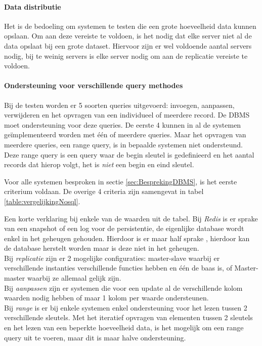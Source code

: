 \paragraph{Data distributie} Het is de bedoeling om systemen te testen die een grote hoeveelheid data kunnen opslaan. Om aan deze vereiste te voldoen, is het nodig dat elke server niet al de data opslaat bij een grote dataset. Hiervoor zijn er wel voldoende aantal servers nodig, bij te weinig servers is elke server nodig om aan de replicatie vereiste te voldoen. 

\paragraph{Ondersteuning voor verschillende query methodes} Bij de testen worden er 5 soorten queries uitgevoerd: invoegen, aanpassen, verwijderen en het opvragen van een individueel of meerdere record. De DBMS moet ondersteuning voor deze queries. De eerste 4 kunnen in al de systemen geïmplementeerd worden met één of meerdere queries. Maar het opvragen van meerdere queries, een range query, is in bepaalde systemen niet ondersteund. Deze range query is een query waar de begin sleutel is gedefinieerd en het aantal records dat hierop volgt, het is \textit{niet} een begin en eind sleutel. 

Voor alle systemen besproken in sectie \ref{sec:BesprekingDBMS}, is het eerste criterium voldaan. De overige 4 criteria zijn samengevat in tabel \ref{table:vergelijkingNosql}. 

Een korte verklaring bij enkele van de waarden uit de tabel. Bij \textit{Redis} is er sprake van een snapshot of een log voor de persistentie, de eigenlijke database wordt enkel in het geheugen gehouden. Hierdoor is er maar half sprake , hierdoor kan de database herstelt worden maar is deze niet in het geheugen. \\
Bij \textit{replicatie} zijn er 2 mogelijke configuraties: master-slave waarbij er verschillende instanties verschillende functies hebben en één de baas is, of Master-master waarbij ze allemaal gelijk zijn. \\
Bij \textit{aanpassen} zijn er systemen die voor een update al de verschillende kolom waarden nodig hebben of maar 1 kolom per waarde ondersteunen. \\
Bij \textit{range} is er bij enkele systemen enkel ondersteuning voor het lezen tussen 2 verschillende sleutels. Met het iteratief opvragen van elementen tussen 2 sleutels en het lezen van een beperkte hoeveelheid data, is het mogelijk om een range query uit te voeren, maar dit is maar halve ondersteuning. 

